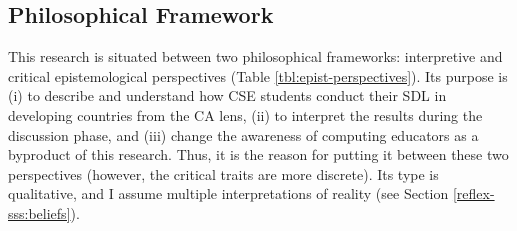                 

        

        

\subsection{Philosophical Framework}
\label{res-met-ss:phil-framework}

This research is situated between two philosophical frameworks: interpretive and critical epistemological perspectives (Table \ref{tbl:epist-perspectives}). Its purpose is (i) to describe and understand how \acrfull{CSE} students conduct their \acrfull{SDL} in developing countries from the \acrfull{CA} lens, (ii) to interpret the results during the discussion phase, and (iii) change the awareness of computing educators as a byproduct of this research. Thus, it is the reason for putting it between these two perspectives (however, the critical traits are more discrete). Its type is qualitative, and I assume multiple interpretations of reality (see Section \ref{reflex-sss:beliefs}).



